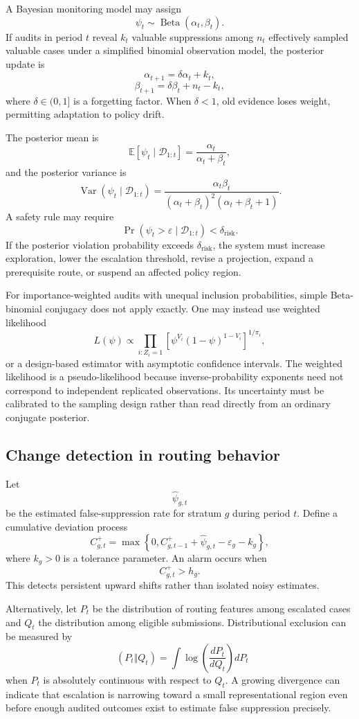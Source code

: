 \documentclass[11pt]{article}
\theoremstyle{definition}
\DeclareMathOperator{\KL}{D_{\mathrm{KL}}}
\DeclareMathOperator{\Var}{Var}
\DeclareMathOperator{\Prob}{Pr}
\newcommand{\E}{\mathbb{E}}
\newcommand{\eps}{\varepsilon}
\begin{document}
A Bayesian monitoring model may assign
\[
\psi_t\sim\operatorname{Beta}(\alpha_t,\beta_t).
\]
If audits in period \(t\) reveal \(k_t\) valuable suppressions among \(n_t\) effectively sampled valuable cases under a simplified binomial observation model, the posterior update is
\[
\alpha_{t+1}
=
\delta\alpha_t+k_t,
\]
\[
\beta_{t+1}
=
\delta\beta_t+n_t-k_t,
\]
where \(\delta\in(0,1]\) is a forgetting factor. When \(\delta<1\), old evidence loses weight, permitting adaptation to policy drift.

The posterior mean is
\[
\E[\psi_t\mid\mathcal{D}_{1:t}]
=
\frac{\alpha_t}{\alpha_t+\beta_t},
\]
and the posterior variance is
\[
\Var(\psi_t\mid\mathcal{D}_{1:t})
=
\frac{
\alpha_t\beta_t
}{
(\alpha_t+\beta_t)^2(\alpha_t+\beta_t+1)
}.
\]
A safety rule may require
\[
\Prob(\psi_t>\eps\mid\mathcal{D}_{1:t})
<
\delta_{\mathrm{risk}}.
\]
If the posterior violation probability exceeds \(\delta_{\mathrm{risk}}\), the system must increase exploration, lower the escalation threshold, revise a projection, expand a prerequisite route, or suspend an affected policy region.

For importance-weighted audits with unequal inclusion probabilities, simple Beta-binomial conjugacy does not apply exactly. One may instead use weighted likelihood
\[
L(\psi)
\propto
\prod_{i:Z_i=1}
\left[
\psi^{V_i}
(1-\psi)^{1-V_i}
\right]^{1/\pi_i},
\]
or a design-based estimator with asymptotic confidence intervals. The weighted likelihood is a pseudo-likelihood because inverse-probability exponents need not correspond to independent replicated observations. Its uncertainty must be calibrated to the sampling design rather than read directly from an ordinary conjugate posterior.

\subsection{Change detection in routing behavior}

Let
\[
\widehat{\psi}_{g,t}
\]
be the estimated false-suppression rate for stratum \(g\) during period \(t\). Define a cumulative deviation process
\[
C_{g,t}^{+}
=
\max\left\{
0,
C_{g,t-1}^{+}
+
\widehat{\psi}_{g,t}
-
\eps_g
-
k_g
\right\},
\]
where \(k_g>0\) is a tolerance parameter. An alarm occurs when
\[
C_{g,t}^{+}>h_g.
\]
This detects persistent upward shifts rather than isolated noisy estimates.

Alternatively, let \(P_t\) be the distribution of routing features among escalated cases and \(Q_t\) the distribution among eligible submissions. Distributional exclusion can be measured by
\[
\KL(P_t\Vert Q_t)
=
\int
\log\!\left(
\frac{dP_t}{dQ_t}
\right)dP_t
\]
when \(P_t\) is absolutely continuous with respect to \(Q_t\). A growing divergence can indicate that escalation is narrowing toward a small representational region even before enough audited outcomes exist to estimate false suppression precisely.
\end{document}
